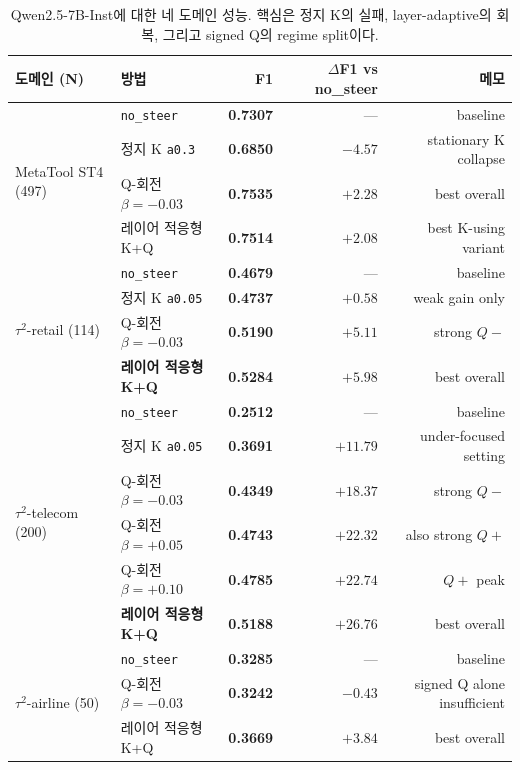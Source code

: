 \begin{table}[t]
\centering
\caption{Qwen2.5-7B-Inst에 대한 네 도메인 성능. 핵심은 정지 K의 실패, layer-adaptive의 회복, 그리고 signed Q의 regime split이다.}
\label{tab:main}
\small
\begin{tabularx}{\linewidth}{@{}lXrrr@{}}
\toprule
도메인 (N) & 방법 & F1 & $\Delta$F1 vs no\_steer & 메모 \\
\midrule
\multirow{4}{*}{MetaTool ST4 (497)}
 & \texttt{no\_steer} & \textbf{0.7307} & --- & baseline \\
 & 정지 K \texttt{a0.3} & \textbf{0.6850} & $\mathbf{-4.57}$ & stationary K collapse \\
 & Q-회전 $\beta=-0.03$ & \textbf{0.7535} & $\mathbf{+2.28}$ & best overall \\
 & 레이어 적응형 K+Q & \textbf{0.7514} & $\mathbf{+2.08}$ & best K-using variant \\
\midrule
\multirow{4}{*}{$\tau^2$-retail (114)}
 & \texttt{no\_steer} & \textbf{0.4679} & --- & baseline \\
 & 정지 K \texttt{a0.05} & \textbf{0.4737} & $+0.58$ & weak gain only \\
 & Q-회전 $\beta=-0.03$ & \textbf{0.5190} & $+5.11$ & strong $Q-$ \\
 & \textbf{레이어 적응형 K+Q} & \textbf{0.5284} & $\boldsymbol{+5.98}$ & best overall \\
\midrule
\multirow{6}{*}{$\tau^2$-telecom (200)}
 & \texttt{no\_steer} & \textbf{0.2512} & --- & baseline \\
 & 정지 K \texttt{a0.05} & \textbf{0.3691} & $+11.79$ & under-focused setting \\
 & Q-회전 $\beta=-0.03$ & \textbf{0.4349} & $+18.37$ & strong $Q-$ \\
 & Q-회전 $\beta=+0.05$ & \textbf{0.4743} & $+22.32$ & also strong $Q+$ \\
 & Q-회전 $\beta=+0.10$ & \textbf{0.4785} & $+22.74$ & $Q+$ peak \\
 & \textbf{레이어 적응형 K+Q} & \textbf{0.5188} & $\boldsymbol{+26.76}$ & best overall \\
\midrule
\multirow{4}{*}{$\tau^2$-airline (50)}
 & \texttt{no\_steer} & \textbf{0.3285} & --- & baseline \\
 & Q-회전 $\beta=-0.03$ & \textbf{0.3242} & $-0.43$ & signed Q alone insufficient \\
 & 레이어 적응형 K+Q & \textbf{0.3669} & $\mathbf{+3.84}$ & best overall \\
\bottomrule
\end{tabularx}
\end{table}

